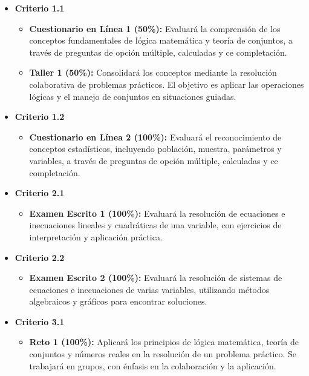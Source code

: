 \documentclass[a4,11pt]{aleph-notas}
\begin{document}
\begin{itemize}[leftmargin=*]
    \item \textbf{Criterio 1.1}
        \begin{itemize}[leftmargin=*]
            \item \textbf{Cuestionario en Línea 1 (50\%):} Evaluará la comprensión de los conceptos fundamentales de lógica matemática y teoría de conjuntos, a través de preguntas de opción múltiple, calculadas y ce completación.
            \item \textbf{Taller 1 (50\%):} Consolidará los conceptos mediante la resolución colaborativa de problemas prácticos. El objetivo es aplicar las operaciones lógicas y el manejo de conjuntos en situaciones guiadas.
        \end{itemize}

    \item \textbf{Criterio 1.2}
        \begin{itemize}[leftmargin=*]
            \item \textbf{Cuestionario en Línea 2 (100\%):} Evaluará el reconocimiento de conceptos estadísticos, incluyendo población, muestra, parámetros y variables, a través de preguntas de opción múltiple, calculadas y ce completación.
        \end{itemize}

    \item \textbf{Criterio 2.1}
        \begin{itemize}[leftmargin=*]
            \item \textbf{Examen Escrito 1 (100\%):} Evaluará la resolución de ecuaciones e inecuaciones lineales y cuadráticas de una variable, con ejercicios de interpretación y aplicación práctica.
        \end{itemize}

    \item \textbf{Criterio 2.2}
        \begin{itemize}[leftmargin=*]
            \item \textbf{Examen Escrito 2 (100\%):} Evaluará la resolución de sistemas de ecuaciones e inecuaciones de varias variables, utilizando métodos algebraicos y gráficos para encontrar soluciones.
        \end{itemize}

    \item \textbf{Criterio 3.1}
        \begin{itemize}[leftmargin=*]
            \item \textbf{Reto 1 (100\%):} Aplicará los principios de lógica matemática, teoría de conjuntos y números reales en la resolución de un problema práctico. Se trabajará en grupos, con énfasis en la colaboración y la aplicación.
        \end{itemize}


\end{itemize}
\end{document}
